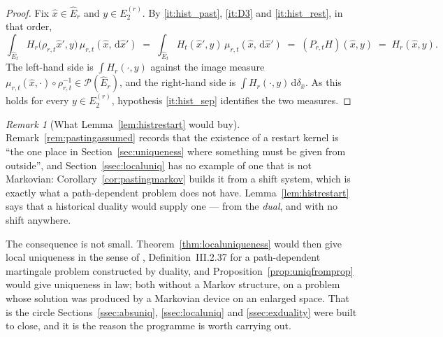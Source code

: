 \documentclass[11pt,a4paper]{article}
\theoremstyle{plain}
\theoremstyle{definition}
\theoremstyle{remark}
\newtheorem{remark}[theorem]{Remark}
\newcommand{\Prob}{\mathcal{P}}                %
\newcommand{\dif}{\,\mathrm{d}}
\newcommand{\JS}{\cite{JS03}}
\begin{document}
\begin{proof}
  Fix $\hat{x} \in \hat{E}_r$ and $y \in E_2^{(r)}$.  By \ref{it:hist_past},
  \ref{it:D3} and \ref{it:hist_rest}, in that order,
  \[
    \int_{\hat{E}_t} H_r\bigl(\rho_{r,t}\hat{x}',y\bigr) \, \mu_{r,t}(\hat{x},\dif\hat{x}')
      \;=\; \int_{\hat{E}_t} H_t(\hat{x}',y) \, \mu_{r,t}(\hat{x},\dif\hat{x}')
      \;=\; (P_{r,t}H)(\hat{x},y)
      \;=\; H_r(\hat{x},y) .
  \]
  The left-hand side is $\int H_r(\cdot,y)$ against the image measure
  $\mu_{r,t}(\hat{x},\cdot) \circ \rho_{r,t}^{-1} \in \Prob(\hat{E}_r)$, and the
  right-hand side is $\int H_r(\cdot,y) \dif\delta_{\hat{x}}$.  As this holds for
  every $y \in E_2^{(r)}$, hypothesis \ref{it:hist_sep} identifies the two
  measures.
\end{proof}

\begin{remark}[What Lemma~\ref{lem:histrestart} would buy]
  \label{rem:histbuys}
  Remark~\ref{rem:pastingassumed} records that the existence of a restart kernel
  is ``the one place in Section~\ref{sec:uniqueness} where something must be given
  from outside'', and Section~\ref{ssec:localuniq} has no example of one that is
  not Markovian: Corollary~\ref{cor:pastingmarkov} builds it from a shift system,
  which is exactly what a path-dependent problem does not have.
  Lemma~\ref{lem:histrestart} says that a historical duality would supply one ---
  from the \emph{dual}, and with no shift anywhere.

  The consequence is not small.  Theorem~\ref{thm:localuniqueness} would then
  give local uniqueness in the sense of \JS, Definition~III.2.37 for a
  path-dependent martingale problem constructed by duality, and
  Proposition~\ref{prop:uniqfromprop} would give uniqueness in law; both without
  a Markov structure, on a problem whose solution was produced by a Markovian
  device on an enlarged space.  That is the circle
  Sections~\ref{ssec:absuniq}, \ref{ssec:localuniq} and \ref{ssec:exduality} were
  built to close, and it is the reason the programme is worth carrying out.
\end{remark}
\end{document}
